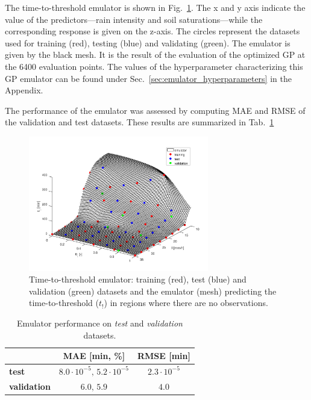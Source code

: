 The time-to-threshold emulator is shown in Fig.~\ref{fig:emulator}.
The x and y axis indicate the value of the predictors---rain intensity and soil saturations---while the corresponding response is given on the z-axis.
The circles represent the datasets used for training (red), testing (blue) and validating (green).
The emulator is given by the black mesh.
It is the result of the evaluation of the optimized GP at the \num{6400} evaluation points.
The values of the hyperparameter characterizing this GP emulator can be found under Sec.~\ref{sec:emulator_hyperparameters} in the Appendix.

The performance of the emulator was assessed by computing MAE and RMSE of the validation and test datasets.
These results are summarized in Tab.~\ref{tab:emulator_performance}

\begin{figure}[h]
  \centering
  \includegraphics[width=0.7\textwidth]{Figures/emulator.png}
  \caption{Time-to-threshold emulator: training (red), test (blue) and validation (green) datasets and the emulator (mesh) predicting the time-to-threshold ($t_!$) in regions where there are no observations.}
  \label{fig:emulator}
\end{figure}


\begin{table}[h]
  \centering
  \caption{Emulator performance on \emph{test} and \emph{validation} datasets.}
  \label{tab:emulator_performance}
  \begin{tabular}{lcc}
    \toprule
     & \textbf{MAE [\si{\minute}, \si{\percent}]} & \textbf{RMSE [\si{\minute}]} \\
    \midrule
    \textbf{test}       & $8.0\cdot 10^{-5},\,5.2\cdot 10^{-5}$ & $2.3\cdot 10^{-5}$\\
    \textbf{validation} & $6.0,\,5.9$ & $4.0$\\
    \bottomrule
  \end{tabular}
\end{table}

